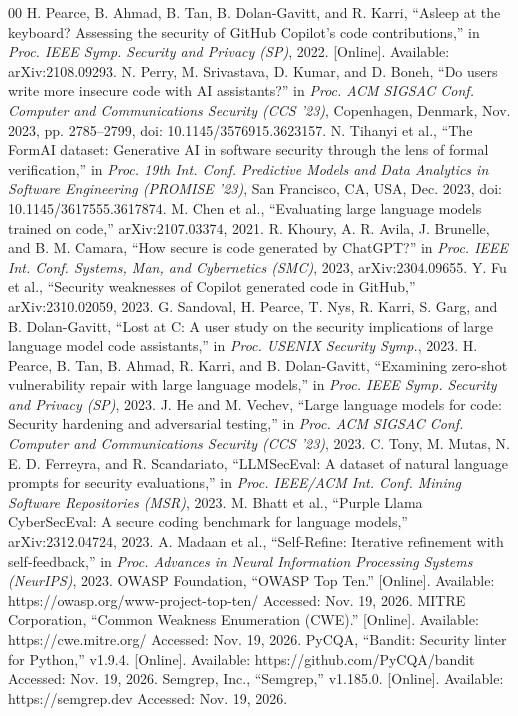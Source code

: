 \documentclass[conference]{IEEEtran}
\begin{document}
\begin{thebibliography}{00}
 H. Pearce, B. Ahmad, B. Tan, B. Dolan-Gavitt, and R. Karri, ``Asleep at the keyboard? Assessing the security of GitHub Copilot's code contributions,'' in \emph{Proc. IEEE Symp. Security and Privacy (SP)}, 2022. [Online]. Available: arXiv:2108.09293.
 N. Perry, M. Srivastava, D. Kumar, and D. Boneh, ``Do users write more insecure code with AI assistants?'' in \emph{Proc. ACM SIGSAC Conf. Computer and Communications Security (CCS '23)}, Copenhagen, Denmark, Nov. 2023, pp. 2785--2799, doi: 10.1145/3576915.3623157.
 N. Tihanyi et al., ``The FormAI dataset: Generative AI in software security through the lens of formal verification,'' in \emph{Proc. 19th Int. Conf. Predictive Models and Data Analytics in Software Engineering (PROMISE '23)}, San Francisco, CA, USA, Dec. 2023, doi: 10.1145/3617555.3617874.
 M. Chen et al., ``Evaluating large language models trained on code,'' arXiv:2107.03374, 2021.
 R. Khoury, A. R. Avila, J. Brunelle, and B. M. Camara, ``How secure is code generated by ChatGPT?'' in \emph{Proc. IEEE Int. Conf. Systems, Man, and Cybernetics (SMC)}, 2023, arXiv:2304.09655.
 Y. Fu et al., ``Security weaknesses of Copilot generated code in GitHub,'' arXiv:2310.02059, 2023. %
 G. Sandoval, H. Pearce, T. Nys, R. Karri, S. Garg, and B. Dolan-Gavitt, ``Lost at C: A user study on the security implications of large language model code assistants,'' in \emph{Proc. USENIX Security Symp.}, 2023.
 H. Pearce, B. Tan, B. Ahmad, R. Karri, and B. Dolan-Gavitt, ``Examining zero-shot vulnerability repair with large language models,'' in \emph{Proc. IEEE Symp. Security and Privacy (SP)}, 2023.
 J. He and M. Vechev, ``Large language models for code: Security hardening and adversarial testing,'' in \emph{Proc. ACM SIGSAC Conf. Computer and Communications Security (CCS '23)}, 2023.
 C. Tony, M. Mutas, N. E. D. Ferreyra, and R. Scandariato, ``LLMSecEval: A dataset of natural language prompts for security evaluations,'' in \emph{Proc. IEEE/ACM Int. Conf. Mining Software Repositories (MSR)}, 2023.
 M. Bhatt et al., ``Purple Llama CyberSecEval: A secure coding benchmark for language models,'' arXiv:2312.04724, 2023.
 A. Madaan et al., ``Self-Refine: Iterative refinement with self-feedback,'' in \emph{Proc. Advances in Neural Information Processing Systems (NeurIPS)}, 2023.
 OWASP Foundation, ``OWASP Top Ten.'' [Online]. Available: https://owasp.org/www-project-top-ten/ Accessed: Nov. 19, 2026.
 MITRE Corporation, ``Common Weakness Enumeration (CWE).'' [Online]. Available: https://cwe.mitre.org/ Accessed: Nov. 19, 2026.
 PyCQA, ``Bandit: Security linter for Python,'' v1.9.4. [Online]. Available: https://github.com/PyCQA/bandit Accessed: Nov. 19, 2026.
 Semgrep, Inc., ``Semgrep,'' v1.185.0. [Online]. Available: https://semgrep.dev Accessed: Nov. 19, 2026.
\end{thebibliography}
\end{document}
